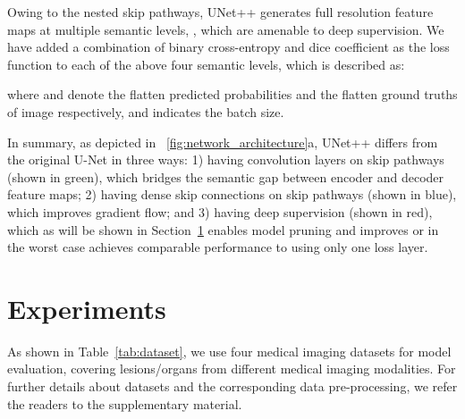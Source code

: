 \documentclass[runningheads]{llncs}
\begin{document}
Owing to the nested skip pathways, UNet++ generates full resolution feature maps at multiple semantic levels, , which are amenable to deep supervision. We have added a combination of binary cross-entropy and dice coefficient as the loss function to each of the above four semantic levels, which is described as:



\iffalse
\noindent where  denotes the flatten predicted probabilities of  image,  indicates the flatten labels of  image, and  indicates the batch size.
\fi
\noindent where  and  denote the flatten predicted probabilities and the flatten ground truths of  image respectively, and  indicates the batch size.



In summary, as depicted in \figurename~\ref{fig:network_architecture}a, UNet++ differs from the original U-Net in three ways: 1) having convolution layers on skip pathways (shown in green), which bridges the semantic gap between encoder and decoder feature maps; 2) having dense skip connections on skip pathways (shown in blue), which improves gradient flow; and 3) having deep supervision (shown in red), which as will be shown in Section~\ref{sec:experiments} enables model pruning and improves or in the worst case achieves comparable performance to using only one loss layer.







\section{Experiments}
\label{sec:experiments}

 As shown in Table~\ref{tab:dataset}, we use four medical imaging datasets for model evaluation, covering lesions/organs from different medical imaging modalities. For further details about datasets and the corresponding data pre-processing, we refer the readers to the supplementary material.
\end{document}
